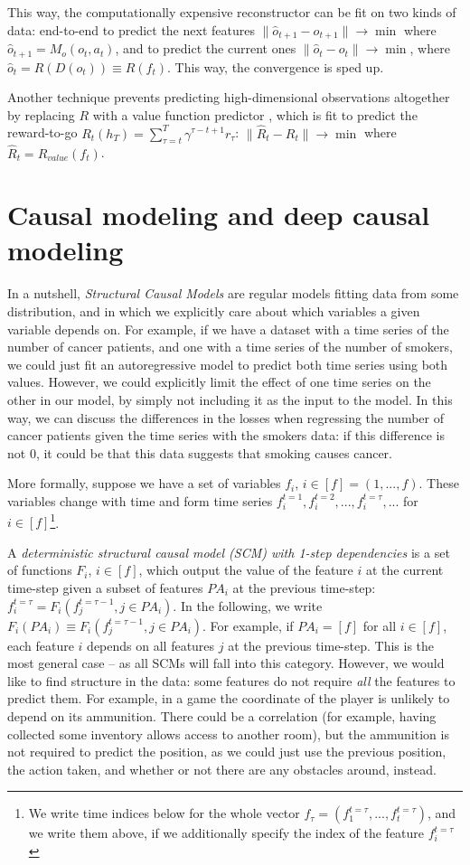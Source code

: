 \documentclass[a4paper,11pt,oneside]{report}
\begin{document}
This way, the computationally expensive reconstructor can be fit on two kinds of data: end-to-end to predict the next features $\|\hat{o}_{t+1}-o_{t+1}\|\to\min$ where $\hat{o}_{t+1}=M_o(o_t, a_t)$, and to predict the current ones $\|\hat{o}_t-o_t\|\to\min$, where $\hat{o}_t=R(D(o_t))\equiv R(f_t)$. This way, the convergence is sped up.

Another technique prevents predicting high-dimensional observations altogether by replacing $R$ with a value function predictor \cite{Schrittwieser2019,Ayoub2020}, which is fit to predict the reward-to-go $R_t(h_T)=\sum\limits_{\tau=t}^{T}\gamma^{\tau-t+1}r_{\tau}$:
$\|\hat{R}_t-R_t\|\to\min$ where $\hat{R}_t=R_{value}(f_t)$.

\section{Causal modeling and deep causal modeling}
\label{sec:causal}
In a nutshell, {\em Structural Causal Models} \cite{Runge2019,Wong2020,Guo2020} are regular models fitting data from some distribution, and in which we explicitly care about which variables a given variable depends on. For example, if we have a dataset with a time series of the number of cancer patients, and one with a time series of the number of smokers, we could just fit an autoregressive model to predict both time series using both values. However, we could explicitly limit the effect of one time series on the other in our model, by simply not including it as the input to the model. In this way, we can discuss the differences in the losses when regressing the number of cancer patients given the time series with the smokers data: if this difference is not 0, it could be that this data suggests that smoking causes cancer.

More formally, suppose we have a set of variables $f_i$, $i\in[f]=(1, ..., f)$. These variables change with time and form time series $f_i^{t=1},f_i^{t=2},...,f_i^{t=\tau},...$ for $i\in[f]$\footnote{We write time indices below for the whole vector $f_{\tau}=(f_1^{t=\tau},...,f_t^{t=\tau})$, and we write them above, if we additionally specify the index of the feature $f_i^{t=\tau}$}.

A {\em deterministic structural causal model (SCM) with 1-step dependencies} is a set of functions $F_i$, $i\in[f]$, which output the value of the feature $i$ at the current time-step given a subset of features $PA_i$ at the previous time-step: $f_i^{t=\tau}=F_i(f_j^{t=\tau-1},j\in PA_i)$. In the following, we write $F_i(PA_i)\equiv F_i(f_j^{t=\tau-1},j\in PA_i)$. For example, if $PA_i=[f]$ for all $i\in[f]$, each feature $i$ depends on all features $j$ at the previous time-step. This is the most general case -- as all SCMs will fall into this category. However, we would like to find structure in the data: some features do not require {\em all} the features to predict them. For example, in a game the coordinate of the player is unlikely to depend on its ammunition. There could be a correlation (for example, having collected some inventory allows access to another room), but the ammunition is not required to predict the position, as we could just use the previous position, the action taken, and whether or not there are any obstacles around, instead.
\end{document}
